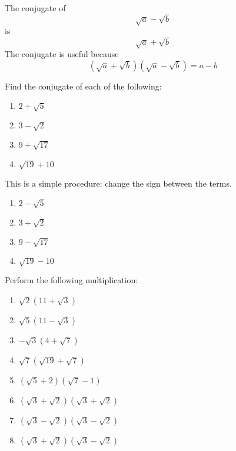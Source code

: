 \begin{myDefinition}\label{def:conjugate}
	The conjugate of
	\[
		\sqrt{a}-\sqrt{b}
	\]
	is 
	\[
		\sqrt{a}+\sqrt{b}
	\]
	The conjugate is useful because
	\[
		(\sqrt{a}+\sqrt{b})(\sqrt{a}-\sqrt{b}) = a-b
	\]
\end{myDefinition} 

\begin{myexample}
Find the conjugate of each of the following:
\begin{multicols}{4}
	\begin{enumerate}
		\item $2+\sqrt{5}$
		\item $3-\sqrt{2}$
		\item $9+\sqrt{17}$
		\item $\sqrt{19}+10$
	\end{enumerate} 
\end{multicols}
\end{myexample}
\begin{myProof} 
	This is a simple procedure: change the sign between the terms.
	\begin{multicols}{4}
		\begin{enumerate}
			\item $2-\sqrt{5}$
			\item $3+\sqrt{2}$
			\item $9-\sqrt{17}$
			\item $\sqrt{19}-10$
		\end{enumerate} 
	\end{multicols}
\end{myProof} 

\begin{myexample}
\drillandskill
Perform the following multiplication:
\begin{multicols}{2}
	\begin{enumerate}
		\item $\sqrt{2}(11+\sqrt{3})$	
		\item $\sqrt{5}(11-\sqrt{3})$	
		\item $-\sqrt{3}(4+\sqrt{7})$	
		\item $\sqrt{7}(\sqrt{19}+\sqrt{7})$	
		\item $(\sqrt{5}+2)(\sqrt{7}-1)$
		\item $(\sqrt{3}+\sqrt{2})(\sqrt{3}+\sqrt{2})$
		\item $(\sqrt{3}-\sqrt{2})(\sqrt{3}-\sqrt{2})$
		\item $(\sqrt{3}+\sqrt{2})(\sqrt{3}-\sqrt{2})$
	\end{enumerate}
\end{multicols}
\end{myexample}
